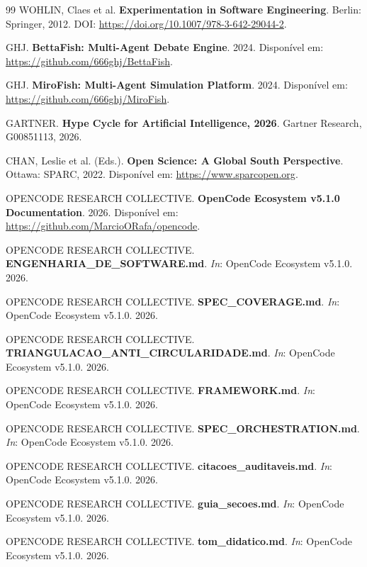 \begin{thebibliography}{99}
WOHLIN, Claes et al. \textbf{Experimentation in Software Engineering}. Berlin: Springer, 2012. DOI: \url{https://doi.org/10.1007/978-3-642-29044-2}.

GHJ. \textbf{BettaFish: Multi-Agent Debate Engine}. 2024. Disponível em: \url{https://github.com/666ghj/BettaFish}.

GHJ. \textbf{MiroFish: Multi-Agent Simulation Platform}. 2024. Disponível em: \url{https://github.com/666ghj/MiroFish}.

GARTNER. \textbf{Hype Cycle for Artificial Intelligence, 2026}. Gartner Research, G00851113, 2026.

CHAN, Leslie et al. (Eds.). \textbf{Open Science: A Global South Perspective}. Ottawa: SPARC, 2022. Disponível em: \url{https://www.sparcopen.org}.

OPENCODE RESEARCH COLLECTIVE. \textbf{OpenCode Ecosystem v5.1.0 Documentation}. 2026. Disponível em: \url{https://github.com/MarcioORafa/opencode}.

OPENCODE RESEARCH COLLECTIVE. \textbf{ENGENHARIA\_DE\_SOFTWARE.md}. \textit{In}: OpenCode Ecosystem v5.1.0. 2026.

OPENCODE RESEARCH COLLECTIVE. \textbf{SPEC\_COVERAGE.md}. \textit{In}: OpenCode Ecosystem v5.1.0. 2026.

OPENCODE RESEARCH COLLECTIVE. \textbf{TRIANGULACAO\_ANTI\_CIRCULARIDADE.md}. \textit{In}: OpenCode Ecosystem v5.1.0. 2026.

OPENCODE RESEARCH COLLECTIVE. \textbf{FRAMEWORK.md}. \textit{In}: OpenCode Ecosystem v5.1.0. 2026.

OPENCODE RESEARCH COLLECTIVE. \textbf{SPEC\_ORCHESTRATION.md}. \textit{In}: OpenCode Ecosystem v5.1.0. 2026.

OPENCODE RESEARCH COLLECTIVE. \textbf{citacoes\_auditaveis.md}. \textit{In}: OpenCode Ecosystem v5.1.0. 2026.

OPENCODE RESEARCH COLLECTIVE. \textbf{guia\_secoes.md}. \textit{In}: OpenCode Ecosystem v5.1.0. 2026.

OPENCODE RESEARCH COLLECTIVE. \textbf{tom\_didatico.md}. \textit{In}: OpenCode Ecosystem v5.1.0. 2026.


\end{thebibliography}
